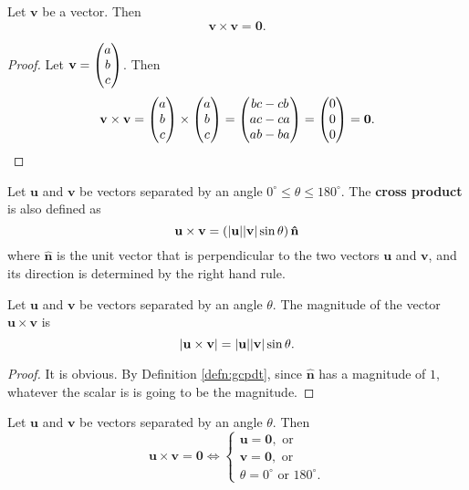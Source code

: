 \documentclass[12pt]{article}
\renewcommand{\vec}{\mathbf}
\begin{document}
\begin{thm}
	Let \(\vec{v}\) be a vector.
	Then 
	\[ \vec{v} \times \vec{v} = \vec{0}. \] 
\end{thm}

\begin{proof}
	Let \(\vec{v} = \cvec{a \\ b \\ c}\).
	Then 
	\[ \vec{v} \times \vec{v} = \cvec{a \\ b \\ c} \times \cvec{a \\ b \\ c} = \cvec{bc - cb \\ ac - ca \\ ab - ba} = \cvec{0 \\ 0 \\ 0} = \vec{0}. \] 
\end{proof}

\begin{defn} \label{defn:gcpdt}
	Let \(\vec{u}\) and \(\vec{v}\) be vectors separated by an angle \(0^\circ \leq \theta \leq 180^\circ\).
	The \textbf{cross product} is also defined as 
	\[ \vec{u} \times \vec{v} = \left( \abs{\vec{u}} \abs{\vec{v}} \sin \theta \right) \vec{\hat{n}} \] 
	where \(\vec{\hat{n}}\) is the unit vector that is perpendicular to the two vectors \(\vec{u}\) and \(\vec{v}\), and its direction is determined by the right hand rule.
\end{defn}

\begin{prop}
	Let \(\vec{u}\) and \(\vec{v}\) be vectors separated by an angle \(\theta\).
	The magnitude of the vector \(\vec{u} \times \vec{v}\) is 
	\[\abs{\vec{u} \times \vec{v}} = \abs{\vec{u}} \abs{\vec{v}} \sin \theta.\]
\end{prop}

\begin{proof}
	It is obvious.
	By Definition \ref{defn:gcpdt}, since \(\vec{\hat{n}}\) has a magnitude of \(1\), whatever the scalar is is going to be the magnitude. 
\end{proof}

\begin{thm}
	Let \(\vec{u}\) and \(\vec{v}\) be vectors separated by an angle \(\theta\).
	Then
	\[ \vec{u} \times \vec{v} = \vec{0} \iff 
		\begin{cases}
			\vec{u} = \vec{0}, \text{ or} \\
			\vec{v} = \vec{0}, \text{ or} \\
			\theta = 0^\circ \text{ or } 180^\circ.
		\end{cases}
	\] 
\end{thm}
\end{document}
